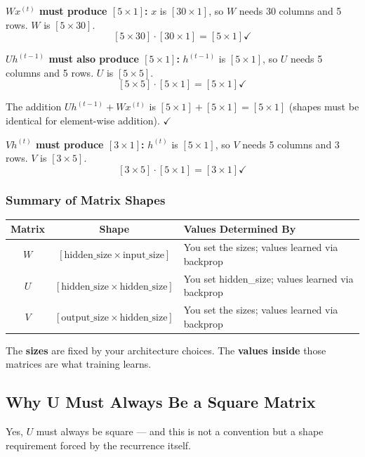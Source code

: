 \documentclass[12pt,a4paper]{article}
\begin{document}
\textbf{$W x^{(t)}$ must produce $[5 \times 1]$:}
$x$ is $[30 \times 1]$, so $W$ needs 30 columns and 5 rows. $W$ is $[5 \times 30]$.
\[
[5 \times 30] \cdot [30 \times 1] = [5 \times 1] \checkmark
\]

\textbf{$U h^{(t-1)}$ must also produce $[5 \times 1]$:}
$h^{(t-1)}$ is $[5 \times 1]$, so $U$ needs 5 columns and 5 rows. $U$ is $[5 \times 5]$.
\[
[5 \times 5] \cdot [5 \times 1] = [5 \times 1] \checkmark
\]

The addition $U h^{(t-1)} + W x^{(t)}$ is $[5 \times 1] + [5 \times 1] = [5 \times 1]$ (shapes must be identical for element-wise addition). $\checkmark$

\textbf{$V h^{(t)}$ must produce $[3 \times 1]$:}
$h^{(t)}$ is $[5 \times 1]$, so $V$ needs 5 columns and 3 rows. $V$ is $[3 \times 5]$.
\[
[3 \times 5] \cdot [5 \times 1] = [3 \times 1] \checkmark
\]

\subsubsection{Summary of Matrix Shapes}

\begin{center}
\begin{tabular}{|c|c|>{\raggedright\arraybackslash}p{5.2cm}|}
\hline
\textbf{Matrix} & \textbf{Shape} & \textbf{Values Determined By} \\
\hline
$W$ & $[\text{hidden\_size} \times \text{input\_size}]$ & You set the sizes; values learned via backprop \\
$U$ & $[\text{hidden\_size} \times \text{hidden\_size}]$ & You set hidden\_size; values learned via backprop \\
$V$ & $[\text{output\_size} \times \text{hidden\_size}]$ & You set the sizes; values learned via backprop \\
\hline
\end{tabular}
\end{center}

The \textbf{sizes} are fixed by your architecture choices. The \textbf{values inside} those matrices are what training learns.


\subsection{Why U Must Always Be a Square Matrix}

Yes, $U$ must always be square --- and this is not a convention but a shape requirement forced by the recurrence itself.
\end{document}
